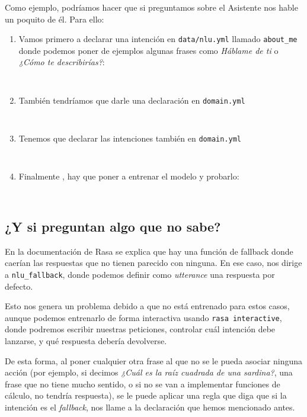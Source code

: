Como ejemplo, podríamos hacer que si preguntamos sobre el Asistente nos hable un poquito de él. Para ello:

\begin{enumerate}
	\item Vamos primero a declarar una intención en \texttt{data/nlu.yml} llamado \texttt{about\_me} donde podemos poner de ejemplos algunas frases como \textit{Háblame de ti} o \textit{¿Cómo te describirías?}:
	\begin{lstlisting}
		
	\end{lstlisting}

	\item También tendríamos que darle una declaración en \texttt{domain.yml}
	\begin{lstlisting}
		
	\end{lstlisting}

	\item Tenemos que declarar las intenciones también en \texttt{domain.yml}
	\begin{lstlisting}
		
	\end{lstlisting}

	\item Finalmente , hay que poner a entrenar el modelo y probarlo:
	\begin{lstlisting}
		
	\end{lstlisting}
\end{enumerate}

\subsection{¿Y si preguntan algo que no sabe?}

En la documentación de Rasa se explica que hay una función de fallback \cite{rasa-fallback} donde caerían las respuestas que no tienen parecido con ninguna. En ese caso, nos dirige a \texttt{nlu\_fallback}, donde podemos definir como \textit{utterance} una respuesta por defecto.

Esto nos genera un problema debido a que no está entrenado para estos casos, aunque podemos entrenarlo de forma interactiva usando \texttt{rasa interactive}, donde podremos escribir nuestras peticiones, controlar cuál intención debe lanzarse, y qué respuesta debería devolverse. 

De esta forma, al poner cualquier otra frase al que no se le pueda asociar ninguna acción (por ejemplo, si decimos \textit{¿Cuál es la raíz cuadrada de una sardina?}, una frase que no tiene mucho sentido, o si no se van a implementar funciones de cálculo, no tendría respuesta), se le puede aplicar una regla que diga que si la intención es el \textit{fallback}, nos llame a la declaración que hemos mencionado antes.

